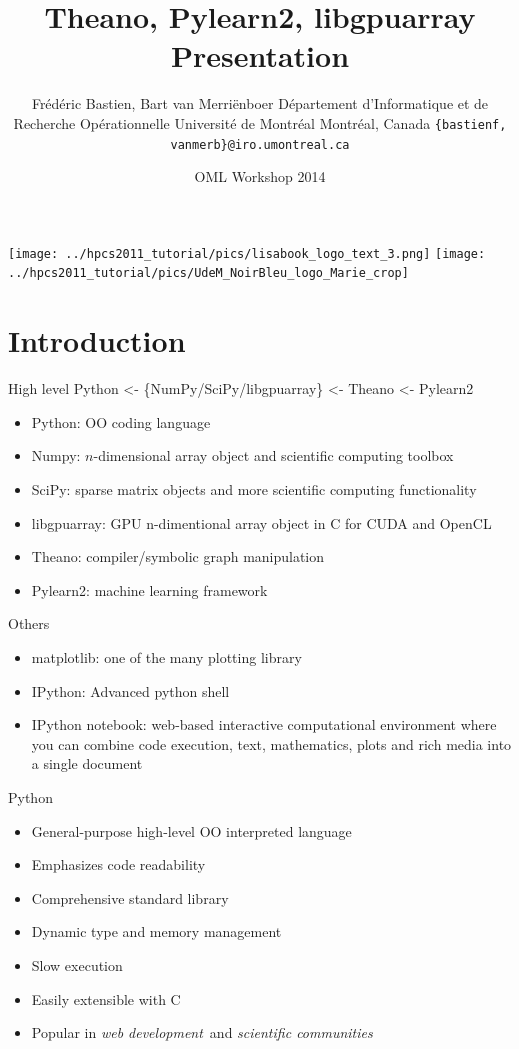 \documentclass[utf8x,xcolor=pdftex,dvipsnames,table]{beamer}
\title{Theano, Pylearn2, libgpuarray Presentation}
\author{%
\footnotesize
Frédéric Bastien, Bart van Merriënboer \newline
Département d'Informatique et de Recherche Opérationnelle \newline
Université de Montréal \newline
Montréal, Canada \newline
\texttt{\{bastienf, vanmerb\}@iro.umontreal.ca} \newline \newline
}
\date{OML Workshop 2014}
\begin{document}
\begin{frame}[plain]
 \titlepage
 \vspace{-5em}
 \texttt{[image: ../hpcs2011\_tutorial/pics/lisabook\_logo\_text\_3.png]}
 \hfill
 \texttt{[image: ../hpcs2011\_tutorial/pics/UdeM\_NoirBleu\_logo\_Marie\_crop]}
\end{frame}

\section{Introduction}
\begin{frame}{High level}\setcounter{page}{1}
  Python <- \{NumPy/SciPy/libgpuarray\} <- Theano <- Pylearn2
  \begin{itemize}
  \item Python: OO coding language
  \item Numpy: $n$-dimensional array object and scientific computing toolbox
  \item SciPy: sparse matrix objects and more scientific computing functionality
  \item libgpuarray: GPU n-dimentional array object in C for CUDA and OpenCL
  \item Theano: compiler/symbolic graph manipulation
  \item Pylearn2: machine learning framework
  \end{itemize}
\end{frame}


\begin{frame}{Others}\setcounter{page}{1}
  \begin{itemize}
  \item matplotlib: one of the many plotting library
  \item IPython: Advanced python shell
  \item IPython notebook: web-based interactive computational environment where you can combine code execution, text, mathematics, plots and rich media into a single document
  \end{itemize}
\end{frame}

\begin{frame}{Python}
  \begin{itemize}
  \item General-purpose high-level OO interpreted language
  \item Emphasizes code readability
  \item Comprehensive standard library
  \item Dynamic type and memory management
  \item Slow execution
  \item Easily extensible with C
  \item Popular in {\em web development}\ and {\em scientific communities}
  \end{itemize}
\end{frame}
\end{document}
